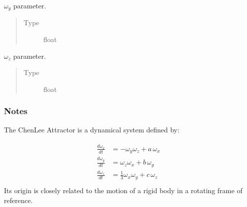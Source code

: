 \documentclass[a4paper,landscape,10pt,english]{sphinxmanual}
\begin{document}
\begin{fulllineitems}

\begin{fulllineitems}
\label{\detokenize{code_docs/simulation_API.simulation:simulation_API.simulation.simulations.ChenLeeAttractor.b}}
\(\omega_y\) parameter.
\begin{quote}\begin{description}
\item[{Type}] \leavevmode
float

\end{description}\end{quote}

\end{fulllineitems}


\begin{fulllineitems}
\label{\detokenize{code_docs/simulation_API.simulation:simulation_API.simulation.simulations.ChenLeeAttractor.c}}
\(\omega_z\) parameter.
\begin{quote}\begin{description}
\item[{Type}] \leavevmode
float

\end{description}\end{quote}

\end{fulllineitems}

\subsubsection*{Notes}

The Chen\sphinxhyphen{}Lee Attractor is a dynamical system defined by:%
\begin{footnote}[1]\sphinxAtStartFootnote
{}
%
\end{footnote}
\begin{align*}\!\begin{aligned}
\frac{d\omega_x}{dt} &= - \omega_y \omega_z + a \, \omega_x\\
\frac{d\omega_y}{dt} &= \omega_z \omega_x + b \, \omega_y\\
\frac{d\omega_z}{dt} &= \frac{1}{3} \omega_x \omega_y + c \, \omega_z\\
\end{aligned}\end{align*}
Its origin is closely related to the motion of a rigid body in a rotating
frame of reference.

\end{fulllineitems}
\end{document}
